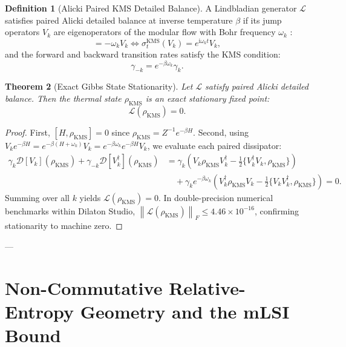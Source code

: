 \documentclass[11pt,a4paper]{article}
\theoremstyle{plain}
\newtheorem{theorem}{Theorem}[section]
\theoremstyle{definition}
\newtheorem{definition}[theorem]{Definition}
\newcommand{\KMS}{\mathrm{KMS}}
\newcommand{\norm}[1]{\left\lVert #1 \right\rVert}
\begin{document}
\begin{definition}[Alicki Paired KMS Detailed Balance]
A Lindbladian generator $\mathcal{L}$ satisfies paired Alicki detailed balance at inverse temperature $\beta$ if its jump operators $V_k$ are eigenoperators of the modular flow with Bohr frequency $\omega_k$ \cite{Alicki1976,Kastler1976}:
\begin{equation}
[H, V_k] = -\omega_k V_k \iff \sigma_t^{\KMS}(V_k) = e^{\mathrm{i} \omega_k t} V_k,
\end{equation}
and the forward and backward transition rates satisfy the KMS condition:
\begin{equation}
\gamma_{-k} = e^{-\beta \omega_k} \gamma_k.
\end{equation}
\end{definition}

\begin{theorem}[Exact Gibbs State Stationarity]
Let $\mathcal{L}$ satisfy paired Alicki detailed balance. Then the thermal state $\rho_{\KMS}$ is an exact stationary fixed point:
\begin{equation}
\mathcal{L}(\rho_{\KMS}) = 0.
\end{equation}
\end{theorem}
\begin{proof}
First, $[H, \rho_{\KMS}] = 0$ since $\rho_{\KMS} = Z^{-1}e^{-\beta H}$. Second, using $V_k e^{-\beta H} = e^{-\beta(H + \omega_k)} V_k = e^{-\beta \omega_k} e^{-\beta H} V_k$, we evaluate each paired dissipator:
\begin{align}
\gamma_k \mathcal{D}[V_k](\rho_{\KMS}) + \gamma_{-k} \mathcal{D}[V_k^\dagger](\rho_{\KMS}) &= \gamma_k \left( V_k \rho_{\KMS} V_k^\dagger - \frac{1}{2}\{V_k^\dagger V_k, \rho_{\KMS}\} \right) \nonumber \\
&\quad + \gamma_k e^{-\beta \omega_k} \left( V_k^\dagger \rho_{\KMS} V_k - \frac{1}{2}\{V_k V_k^\dagger, \rho_{\KMS}\} \right) = 0.
\end{align}
Summing over all $k$ yields $\mathcal{L}(\rho_{\KMS}) = 0$. In double-precision numerical benchmarks within Dilaton Studio, $\norm{\mathcal{L}(\rho_{\KMS})}_F \le 4.46 \times 10^{-16}$, confirming stationarity to machine zero.
\end{proof}

---

\section{Non-Commutative Relative-Entropy Geometry and the mLSI Bound}
\end{document}
